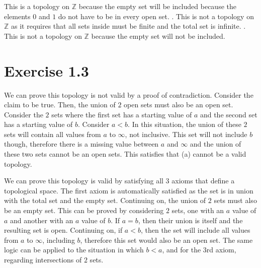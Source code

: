 \documentclass{report}
\begin{document}
\sol This is a topology on $\mathbb{Z}$ because the empty set will be included because the elements $0$ and $1$ do not have to be in every open set.
.
\sol This is not a topology on $\mathbb{Z}$ as it requires that all sets inside must be finite and the total set is infinite.                                                         
\protect{}.
\protect\sol This is not a topology on $\mathbb{Z}$ because the empty set will not be included.
\section{Exercise 1.3}


\sol We can prove this topology is not valid by a proof of contradiction. Consider the claim to be true. Then, the union of $2$ open sets must also be an open set. Consider the $2$ sets where the first set has a starting value of $a$ and the second set has a starting value of $b$. Consider $a < b$. In this situation, the union of these $2$ sets will contain all values from $a$ to $\infty$, not inclusive. This set will not include $b$ though, therefore there is a missing value between $a$ and $\infty$ and the union of these two sets cannot be an open sets. This satisfies that (a) cannot be a valid topology. 

\qs{1.3.b}{\[\tau = \{[a, \infty) \mid a \in \mathbb{R}\} \cup \{\phi, \mathbb{R}\}\].} 

\sol We can prove this topology is valid by satisfying all $3$ axioms that define a topological space. The first axiom is automatically satisfied as the set is in union with the total set and the empty set. Continuing on, the union of $2$ sets must also be an empty set. This can be proved by considering $2$ sets, one with an $a$ value of $a$ and another with an $a$ value of $b$. If $a = b$, then their union is itself and the resulting set is open. Continuing on, if $a < b$, then the set will include all values from $a$ to $\infty$, including $b$, therefore this set would also be an open set. The same logic can be applied to the situation in which $b < a$, and for the $3$rd axiom, regarding intersections of $2$ sets. 
\end{document}
